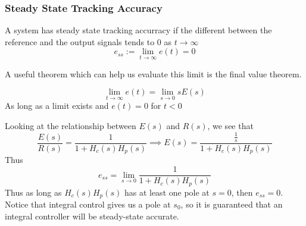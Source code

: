 \subsubsection{Steady State Tracking Accuracy}
\begin{figure}[H]
    \centering
    
\end{figure}
\begin{definition}
    A system has steady state tracking accurracy if the different between the reference and the output signals
    tends to 0 as $t\rightarrow \infty$
    $$e_{ss} := \lim_{t\rightarrow\infty}{e(t)}=0$$
\end{definition}
A useful theorem which can help us evaluate this limit is the final value theorem.
\begin{theorem}
    $$\lim_{t\rightarrow\infty}{e(t)} = \lim_{s\rightarrow0}{sE(s)}$$
    As long as a limit exists and $e(t)=0$ for $t<0$
\end{theorem}
Looking at the relationship between $E(s)$ and $R(s)$, we see that 
$$\frac{E(s)}{R(s)} = \frac{1}{1+H_c(s)H_p(s)} \implies E(s) = \frac{\frac{1}{s}}{1+H_c(s)H_p(s)}$$
Thus
$$e_{ss}=\lim_{s\rightarrow0}{\frac{1}{1+H_c(s)H_p(s)}}$$
Thus as long as $H_c(s)H_p(s)$ has at least one pole at $s=0$, then $e_{ss}=0$.
Notice that integral control gives us a pole at $s_0$, so it is guaranteed that an integral controller will be steady-state accurate.
